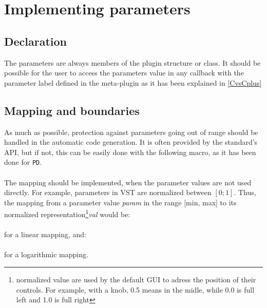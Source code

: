 \section{Implementing parameters}
\subsection{Declaration}
\noindent The parameters are always members of the plugin structure or
class. It should be possible for the user to access the parameters
value in any callback with the parameter label defined in
the meta-plugin as it has been explained in \ref{CvsCplus}

\subsection{Mapping and boundaries}
\noindent As much as possible, protection against parameters going out
of range should be handled in the automatic code generation. It is
often provided by the standard's API, but if not, this can be easily done 
with the following macro, as it has been done for \verb|PD|.\\

\\

\noindent The mapping should be implemented, when the parameter
values are not used directly. For example, parameters in VST are
normalized between $[0;1]$. Thus, the mapping from a parameter value
\emph{param} in the range [min, max] to its normalized
representation\footnote{normalized value are used by the default GUI
  to adress the position of their controls. For example, with a knob,
  0.5 means in the midle, while 0.0 is full left and 1.0 is full
  right}\emph{val} would be:\\ 

\\

\noindent for a linear mapping, and: \\

\\

\noindent for a logarithmic mapping. \\

